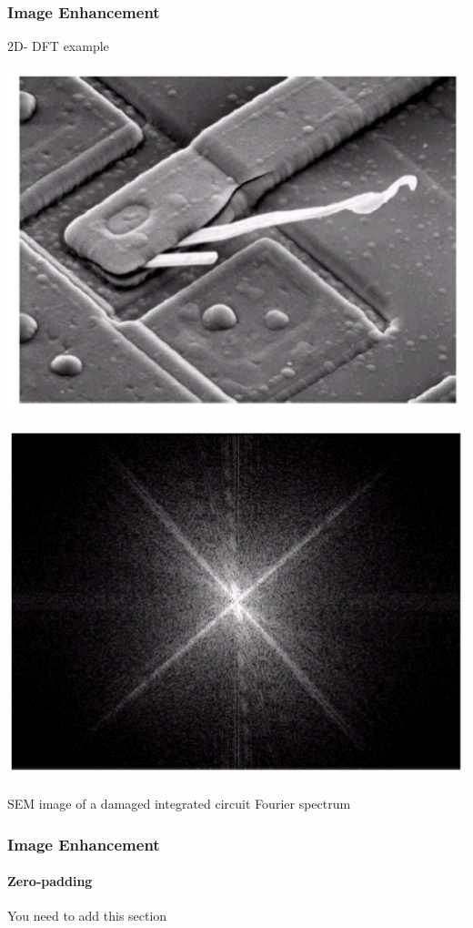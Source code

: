 \documentclass{beamer}
\begin{document}
\begin{frame}
\frametitle{Image Enhancement}
\begin{block}{2D- DFT example}
\begin{center}
\includegraphics[scale= 0.3]{images/F1_ex_original.png}\
\includegraphics[scale= 0.3]{images/F1_ex_FS.png}
\end{center} 
\scriptsize{SEM image of a damaged integrated circuit}  \quad \quad \scriptsize{Fourier spectrum}
\end{block}
\end{frame}
\begin{frame}
\frametitle{Image Enhancement}
\framesubtitle{Zero-padding}
{\color{red} You need to add this section}
\end{frame}
\end{document}

